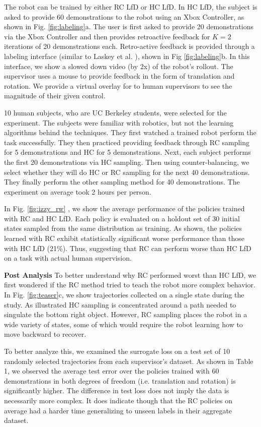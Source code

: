\documentclass[10pt, conference]{ieeeconf}      %
\begin{document}
The robot can be trained by either RC LfD or HC LfD.  In HC LfD, the subject is asked to provide 60 demonstrations to the robot using an Xbox Controller, as shown in Fig. \ref{fig:labeling}a. The user is first asked to provide 20 demonstrations via the Xbox Controller and then provides retroactive feedback for $K=2$ iterations of 20 demonstrations each. Retro-active feedback is provided through a labeling interface (similar to Laskey et al. \cite{laskeyrobot}), shown in Fig \ref{fig:labeling}b. In this interface, we show a slowed down video (by 2x) of the robot's rollout. The supervisor uses a mouse to provide feedback in the form of translation and rotation. We provide a virtual overlay for to human supervisors to see the magnitude of their given control. 

10 human subjects, who are UC Berkeley students, were selected for the experiment. The subjects were familiar with robotics, but not the learning algorithms behind the techniques. They first watched a trained robot perform the task successfully.  They then practiced providing feedback through RC sampling for 5 demonstrations and HC for 5 demonstrations. Next, each subject performs the first 20 demonstrations via HC sampling.  Then using counter-balancing, we select whether they will do HC or RC sampling for the next 40 demonstrations.  They finally perform the other sampling method for 40 demonstrations. The experiment on average took 2 hours per person. 

In Fig. \ref{fig:izzy_rw} , we show the average performance of the policies trained with RC and HC LfD. Each policy is evaluated on a holdout set of 30 initial states sampled from the same distribution as training. As shown, the policies learned with RC exhibit statistically significant worse performance than those with HC LfD (21\%). Thus, suggesting that RC can perform worse than HC LfD on a task with actual human supervision. 


\noindent \textbf{Post Analysis}
To better understand why RC performed worst than HC LfD, we first wondered if the RC method tried to teach the robot more complex behavior. In Fig. \ref{fig:teaser}c, we show trajectories collected on a single state during the study. As illustrated HC sampling is concentrated around a path needed to singulate the bottom right object. However, RC sampling places the robot in a wide variety of states, some of which would require the robot learning how to move backward to recover. 

To better analyze this, we examined the surrogate loss on a test set of 10 randomly selected trajectories from each supervisor's dataset.  As shown in Table 1, we observed the average test error over the policies trained with 60 demonstrations in both degrees of freedom (i.e. translation and rotation) is significantly higher.  The difference in test loss does not imply the data is necessarily more complex.  It does indicate though that the RC policies on average had a harder time generalizing to unseen labels in their aggregate dataset. 
\end{document}
